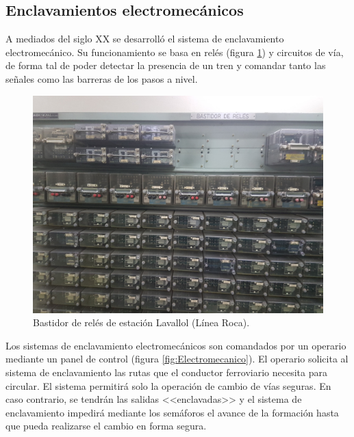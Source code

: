 		\subsection{Enclavamientos electromecánicos}
			
			A mediados del siglo XX se desarrolló el sistema de enclavamiento electromecánico. Su funcionamiento se basa en relés (figura \ref{fig:Reles}) y circuitos de vía, de forma tal de poder detectar la presencia de un tren y comandar tanto las señales como las barreras de los pasos a nivel.
				
			\begin{figure}[htbp!]
				\centering
				\includegraphics[scale=.08]{./Figures/Reles}
				\caption{Bastidor de relés de estación Lavallol (Línea Roca).}
				\label{fig:Reles}
			\end{figure}
		
			\vspace{7cm}
			
			Los sistemas de enclavamiento electromecánicos son comandados por un operario mediante un panel de control (figura \ref{fig:Electromecanico}). El operario solicita al sistema de enclavamiento las rutas que el conductor ferroviario necesita para circular. El sistema permitirá solo la operación de cambio de vías seguras. En caso contrario, se tendrán las salidas <<enclavadas>> y el sistema de enclavamiento impedirá mediante los semáforos el avance de la formación hasta que pueda realizarse el cambio en forma segura.
		
